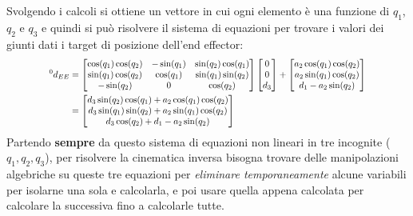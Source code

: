 ﻿\documentclass[11pt, a4paper]{article}
\begin{document}
\newpage
Svolgendo i calcoli si ottiene un vettore in cui ogni elemento è una funzione di $q_1$, $q_2$ e $q_3$ e quindi si può risolvere il sistema di equazioni per trovare i valori dei giunti dati i target di posizione dell'end effector:
\[
\scalebox{0.8}{$
\begin{aligned}
    {}^{0}d_{EE} & =
    \begin{bmatrix}
        \cos(q_1)\cos(q_2) & -\sin(q_1) & \sin(q_2)\cos(q_1) \\
        \sin(q_1)\cos(q_2) & \cos(q_1) & \sin(q_1)\sin(q_2) \\
        -\sin(q_2) & 0 & \cos(q_2)
    \end{bmatrix}
    \begin{bmatrix}
        0\\
        0\\
        d_{3}
    \end{bmatrix}
    +
    \begin{bmatrix}
    a_{2}\cos(q_1)\cos(q_2) \\
    a_{2}\sin(q_1)\cos(q_2) \\
    d_{1} - a_{2}\sin(q_2)
    \end{bmatrix}\\
    &=
    \begin{bmatrix}
    d_3 \sin(q_2) \cos(q_1) + a_2 \cos(q_1) \cos(q_2)\\
    d_3 \sin(q_1) \sin(q_2) + a_2 \sin(q_1) \cos(q_2) \\
    d_3 \cos(q_2) + d_1 - a_2 \sin(q_2)
    \end{bmatrix}
\end{aligned}
$}
\]
Partendo \textbf{sempre} da questo sistema di equazioni non lineari in tre incognite ($q_1, q_2, q_3$), per risolvere la cinematica inversa bisogna trovare delle manipolazioni algebriche su queste tre equazioni per \emph{eliminare temporaneamente} alcune variabili per isolarne una sola e calcolarla, e poi usare quella appena calcolata per calcolare la successiva fino a calcolarle tutte.
\end{document}
